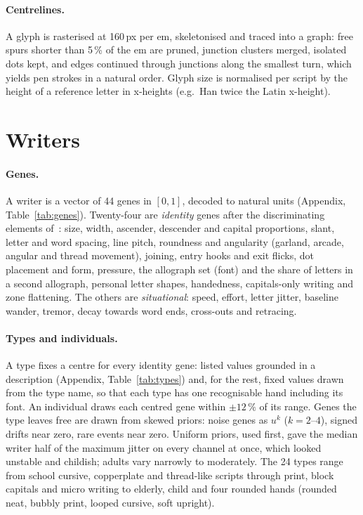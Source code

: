 \documentclass[10pt,twocolumn]{article}
\begin{document}
\paragraph{Centrelines.} A glyph is rasterised at 160\,px per em, skeletonised and traced into a graph: free spurs
shorter than 5\,\% of the em are pruned, junction clusters merged, isolated dots kept, and edges continued through
junctions along the smallest turn, which yields pen strokes in a natural order. Glyph size is normalised per script
by the height of a reference letter in x-heights (e.g.\ Han twice the Latin x-height).

\section{Writers}
\label{sec:writer}

\paragraph{Genes.} A writer is a vector of 44 genes in $[0,1]$, decoded to natural units (Appendix,
Table~\ref{tab:genes}). Twenty-four are \emph{identity} genes after the discriminating elements of~\cite{huber1999}:
size, width, ascender, descender and capital proportions, slant, letter and word spacing, line pitch, roundness and
angularity (garland, arcade, angular and thread movement), joining, entry hooks and exit flicks, dot placement and
form, pressure, the allograph set (font) and the share of letters in a second allograph, personal letter shapes,
handedness, capitals-only writing and zone flattening. The others are \emph{situational}: speed, effort, letter
jitter, baseline wander, tremor, decay towards word ends, cross-outs and retracing.

\paragraph{Types and individuals.} A type fixes a centre for every identity gene: listed values grounded in a
description (Appendix, Table~\ref{tab:types}) and, for the rest, fixed values drawn from the type name, so that
each type has one recognisable hand including its font. An individual draws each centred gene within $\pm12\,\%$ of
its range. Genes the type leaves free are drawn from skewed priors: noise genes as $u^k$ ($k=2$--$4$), signed drifts
near zero, rare events near zero. Uniform priors, used first, gave the median writer half of the maximum jitter on
every channel at once, which looked unstable and childish; adults vary narrowly to moderately. The 24 types range
from school cursive, copperplate and thread-like scripts through print, block capitals and micro writing to elderly,
child and four rounded hands (rounded neat, bubbly print, looped cursive, soft upright).
\end{document}
